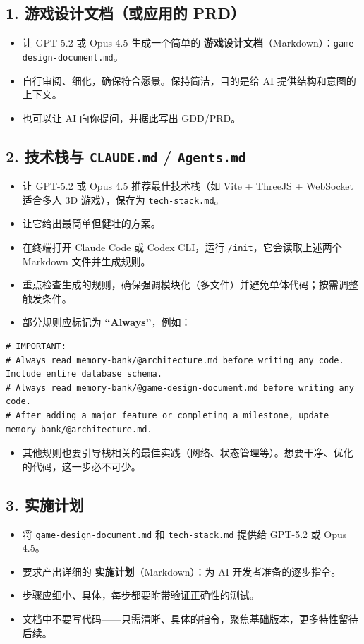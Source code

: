 \documentclass[12pt]{article}
\begin{document}
\subsection{1. 游戏设计文档（或应用的 PRD）}
\begin{itemize}
  \item 让 GPT-5.2 或 Opus 4.5 生成一个简单的 \textbf{游戏设计文档}（Markdown）：\texttt{game-design-document.md}。
  \item 自行审阅、细化，确保符合愿景。保持简洁，目的是给 AI 提供结构和意图的上下文。
  \item 也可以让 AI 向你提问，并据此写出 GDD/PRD。
\end{itemize}

\subsection{2. 技术栈与 \texttt{CLAUDE.md} / \texttt{Agents.md}}
\begin{itemize}
  \item 让 GPT-5.2 或 Opus 4.5 推荐最佳技术栈（如 Vite + ThreeJS + WebSocket 适合多人 3D 游戏），保存为 \texttt{tech-stack.md}。
  \item 让它给出最简单但健壮的方案。
  \item 在终端打开 Claude Code 或 Codex CLI，运行 \texttt{/init}，它会读取上述两个 Markdown 文件并生成规则。
  \item 重点检查生成的规则，确保强调模块化（多文件）并避免单体代码；按需调整触发条件。
  \item 部分规则应标记为 \textbf{“Always”}，例如：
\end{itemize}
\begin{verbatim}
# IMPORTANT:
# Always read memory-bank/@architecture.md before writing any code. Include entire database schema.
# Always read memory-bank/@game-design-document.md before writing any code.
# After adding a major feature or completing a milestone, update memory-bank/@architecture.md.
\end{verbatim}
\begin{itemize}
  \item 其他规则也要引导栈相关的最佳实践（网络、状态管理等）。想要干净、优化的代码，这一步必不可少。
\end{itemize}

\subsection{3. 实施计划}
\begin{itemize}
  \item 将 \texttt{game-design-document.md} 和 \texttt{tech-stack.md} 提供给 GPT-5.2 或 Opus 4.5。
  \item 要求产出详细的 \textbf{实施计划}（Markdown）：为 AI 开发者准备的逐步指令。
  \item 步骤应细小、具体，每步都要附带验证正确性的测试。
  \item 文档中不要写代码——只需清晰、具体的指令，聚焦基础版本，更多特性留待后续。
\end{itemize}
\end{document}
